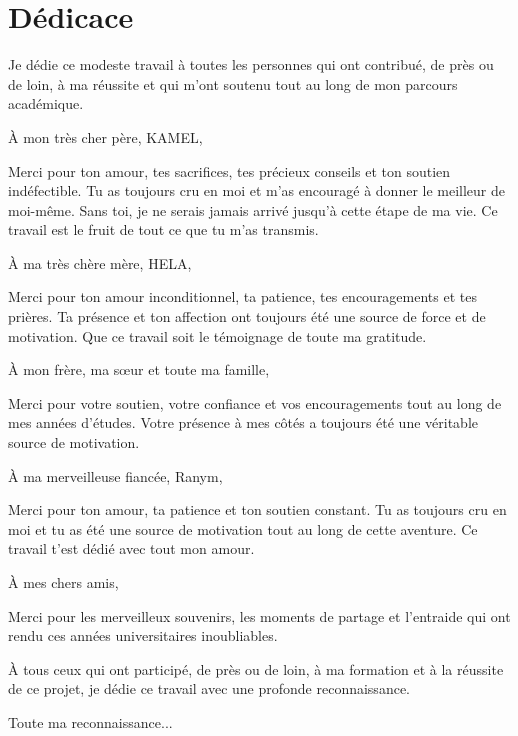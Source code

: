 \chapter*{\Huge Dédicace}
\vspace{8mm}
\vspace{8mm}

\begingroup
\vspace{0mm}
    \large \raggedright
    
    Je dédie ce modeste travail à toutes les personnes qui ont contribué, de près ou de loin, à ma réussite et qui m'ont soutenu tout au long de mon parcours académique.

À mon très cher père, KAMEL,

Merci pour ton amour, tes sacrifices, tes précieux conseils et ton soutien indéfectible. Tu as toujours cru en moi et m'as encouragé à donner le meilleur de moi-même. Sans toi, je ne serais jamais arrivé jusqu'à cette étape de ma vie. Ce travail est le fruit de tout ce que tu m'as transmis.

À ma très chère mère, HELA,

Merci pour ton amour inconditionnel, ta patience, tes encouragements et tes prières. Ta présence et ton affection ont toujours été une source de force et de motivation. Que ce travail soit le témoignage de toute ma gratitude.

À mon frère, ma sœur et toute ma famille,

Merci pour votre soutien, votre confiance et vos encouragements tout au long de mes années d'études. Votre présence à mes côtés a toujours été une véritable source de motivation.

À ma merveilleuse fiancée, Ranym,

Merci pour ton amour, ta patience et ton soutien constant. Tu as toujours cru en moi et tu as été une source de motivation tout au long de cette aventure. Ce travail t'est dédié avec tout mon amour.

À mes chers amis,

Merci pour les merveilleux souvenirs, les moments de partage et l'entraide qui ont rendu ces années universitaires inoubliables.

À tous ceux qui ont participé, de près ou de loin, à ma formation et à la réussite de ce projet, je dédie ce travail avec une profonde reconnaissance.
    
    
  
\endgroup

\begin{flushright}
    \LARGE Toute ma reconnaissance...
\end{flushright}